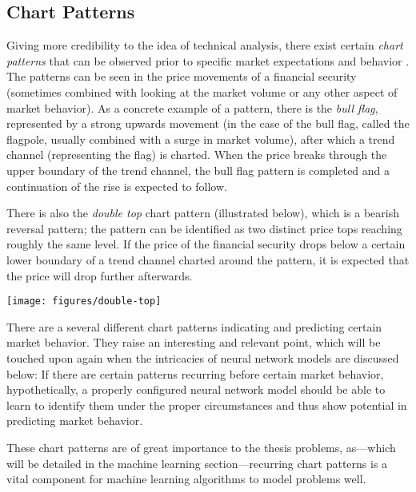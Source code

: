\begin{multicols}{2}
\subsection{Chart Patterns}

Giving more credibility to the idea of technical analysis, there exist certain
\textit{chart patterns} that can be observed prior to specific market
expectations and behavior \citep{technicalanalysis2010}. The patterns can be
seen in the price movements of a financial security (sometimes combined with
looking at the market volume or any other aspect of market behavior).  As a
concrete example of a pattern, there is the \textit{bull flag}, represented by a
strong upwards movement (in the case of the bull flag, called the flagpole,
usually combined with a surge in market volume), after which a trend channel
(representing the flag) is charted.  When the price breaks through the upper
boundary of the trend channel, the bull flag pattern is completed and a
continuation of the rise is expected to follow.

There is also the \textit{double top} chart pattern (illustrated below), which
is a bearish reversal pattern; the pattern can be identified as two distinct
price tops reaching roughly the same level.  If the price of the financial
security drops below a certain lower boundary of a trend channel charted around
the pattern, it is expected that the price will drop further afterwards.

\begin{Figure}
  \texttt{[image: figures/double-top]}
\end{Figure}

\noindent There are a several different chart patterns indicating and predicting
certain market behavior.  They raise an interesting and relevant point, which
will be touched upon again when the intricacies of neural network models are
discussed below: If there are certain patterns recurring before certain market
behavior, hypothetically, a properly configured neural network model should be
able to learn to identify them under the proper circumstances and thus show
potential in predicting market behavior.

These chart patterns are of great importance to the thesis problems, as---which
will be detailed in the machine learning section---recurring chart patterns is a
vital component for machine learning algorithms to model problems well.


\end{multicols}
